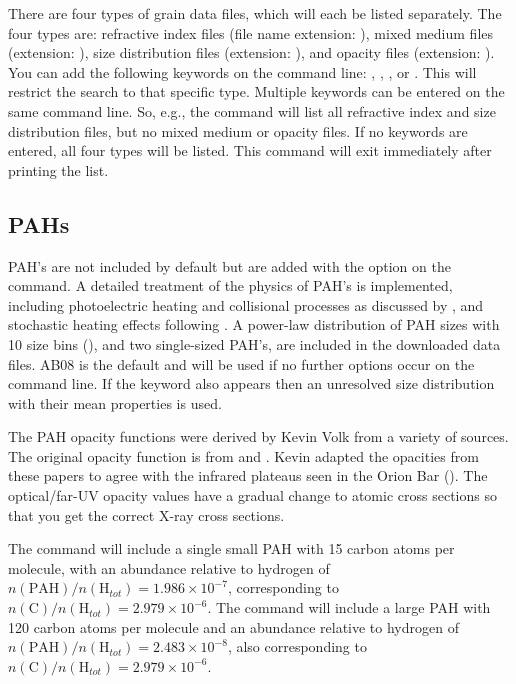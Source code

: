 There are four types of grain data files, which will each be listed
separately. The four types are: refractive index files (file name extension:
), mixed medium files (extension: ), size
distribution files (extension: ), and opacity files
(extension: ). You can add the following keywords on the
command line: , , , or
. This will restrict the search to that specific type. Multiple
keywords can be entered on the same command line. So, e.g., the command
 will list all refractive index and size
distribution files, but no mixed medium or opacity files. If no keywords are
entered, all four types will be listed. This command will exit immediately
after printing the list.

\subsection{PAHs}
\label{sec:GrainPAHcommands}

PAH's are not included by default but are added with the
 option on the
 command.
A detailed treatment of the physics of PAH's is implemented,
including photoelectric heating and collisional processes as discussed by
\citet{Weingartner2001a}, and stochastic heating effects following
\citet{Guhathakurta1989}.
A power-law distribution of PAH sizes with
10 size bins (\citealp[hereafter AB08]{Abel2008}),
and two single-sized PAH's,
are included in the downloaded data files.
AB08 is the default and will
be used if no further options occur on the command line.
If the keyword
 also appears then an unresolved
size distribution with their mean
properties is used.

The PAH opacity functions were derived by Kevin Volk
from a variety of sources.
The original opacity function is from \citet{Desert1990} and
\citet{Schutte1993}.
Kevin adapted the
opacities from these papers to agree with the infrared plateaus seen in
the Orion Bar (\citealp{Bregman1989}).
The optical/far-UV opacity values
have a gradual change to atomic cross sections so that you get the correct
X-ray cross sections.

The command  will include a
single small PAH with 15 carbon
atoms per molecule, with an abundance relative to hydrogen of
$n(
{{\mathrm{PAH}}})/n( {{\mathrm{H}}_{tot} } ) = 1.986 \times 10^{
- 7} $,
corresponding to
$n( {\mathrm{C}})/n( {{\mathrm{H}}_{tot}
} ) = 2.979 \times 10^{ - 6} $.
The command  will include
a large PAH with 120 carbon
atoms per molecule and an abundance relative to hydrogen of
$n(
{{\mathrm{PAH}}} )/n( {{\mathrm{H}}_{tot} } ) = 2.483 \times 10^{
- 8} $, also corresponding to $n( {\mathrm{C}} )/n( {{\mathrm{H}}_{tot}
} ) = 2.979 \times 10^{ - 6} $.

